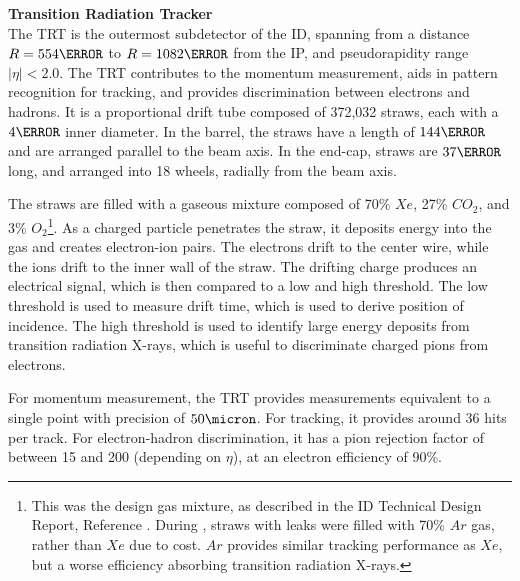 \noindent\textbf{Transition Radiation Tracker}\\
\indent The \gls{TRT} is the outermost subdetector of the \gls{ID}, spanning from a distance $R=\unit{554}{\mm}$ to $R= \unit{1082}{\mm}$ from the \gls{IP}, and pseudorapidity range $|\eta| < 2.0$. The \gls{TRT} contributes to the momentum measurement, aids in pattern recognition for tracking, and provides discrimination between electrons and hadrons. It is a proportional drift tube composed of 372,032 straws, each with a $\unit{4}{\mm}$ inner diameter. In the barrel, the straws have a length of $\unit{144}{\cm}$ and are arranged parallel to the beam axis. In the end-cap, straws are $\unit{37}{\cm}$ long, and arranged into 18 wheels, radially from the beam axis.

The straws are filled with a gaseous mixture composed of 70\% $Xe$, 27\% $CO_2$, and 3\% $O_2$\footnote{This was the design gas mixture, as described in the \gls{ID} Technical Design Report, Reference \cite{inner-detector-tdr}. During \RunTwo, straws with leaks were filled with 70\% $Ar$ gas, rather than $Xe$ due to cost. $Ar$ provides similar tracking performance as $Xe$, but a worse efficiency absorbing transition radiation X-rays.}. As a charged particle penetrates the straw, it deposits energy into the gas and creates electron-ion pairs. The electrons drift to the center wire, while the ions drift to the inner wall of the straw. The drifting charge produces an electrical signal, which is then compared to a low and high threshold. The low threshold is used to measure drift time, which is used to derive position of incidence. The high threshold is used to identify large energy deposits from transition radiation X-rays, which is useful to discriminate charged pions from electrons.

For momentum measurement, the \gls{TRT} provides measurements equivalent to a single point with precision of $\unit{50}{\micron}$. For tracking, it provides around 36 hits per track. For electron-hadron discrimination, it has a pion rejection factor of between 15 and 200 (depending on $\eta$), at an electron efficiency of 90\%.


